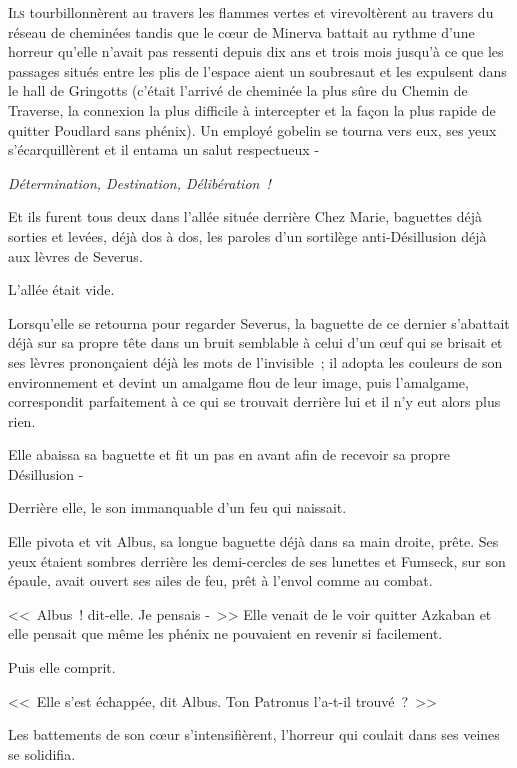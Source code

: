 
\lettrine{I}{ls} tourbillonnèrent au travers les flammes vertes et virevoltèrent au travers du réseau de cheminées tandis que le cœur de Minerva battait au rythme d'une horreur qu'elle n'avait pas ressenti depuis dix ans et trois mois jusqu'à ce que les passages situés entre les plis de l'espace aient un soubresaut et les expulsent dans le hall de Gringotts (c'était l'arrivé de cheminée la plus sûre du Chemin de Traverse, la connexion la plus difficile à intercepter et la façon la plus rapide de quitter Poudlard sans phénix). Un employé gobelin se tourna vers eux, ses yeux s'écarquillèrent et il entama un salut respectueux -

\emph{Détermination, Destination, Délibération~!}

Et ils furent tous deux dans l'allée située derrière Chez Marie, baguettes déjà sorties et levées, déjà dos à dos, les paroles d'un sortilège anti-Désillusion déjà aux lèvres de Severus.

L'allée était vide.

Lorsqu'elle se retourna pour regarder Severus, la baguette de ce dernier s'abattait déjà sur sa propre tête dans un bruit semblable à celui d'un œuf qui se brisait et ses lèvres prononçaient déjà les mots de l'invisible~; il adopta les couleurs de son environnement et devint un amalgame flou de leur image, puis l'amalgame, correspondit parfaitement à ce qui se trouvait derrière lui et il n'y eut alors plus rien.

Elle abaissa sa baguette et fit un pas en avant afin de recevoir sa propre Désillusion -

Derrière elle, le son immanquable d'un feu qui naissait.

Elle pivota et vit Albus, sa longue baguette déjà dans sa main droite, prête. Ses yeux étaient sombres derrière les demi-cercles de ses lunettes et Fumseck, sur son épaule, avait ouvert ses ailes de feu, prêt à l'envol comme au combat.

<<~Albus~! dit-elle. Je pensais -~>> Elle venait de le voir quitter Azkaban et elle pensait que même les phénix ne pouvaient en revenir si facilement.

Puis elle comprit.

<<~Elle s'est échappée, dit Albus. Ton Patronus l'a-t-il trouvé~?~>>

Les battements de son cœur s'intensifièrent, l'horreur qui coulait dans ses veines se solidifia.

